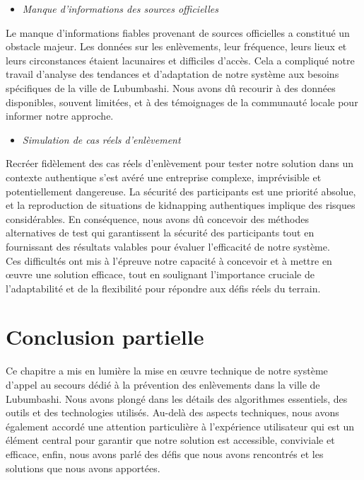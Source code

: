 \begin{itemize}
	\item \textit{Manque d'informations des sources officielles }
\end{itemize}

Le manque d'informations fiables provenant de sources officielles a constitué un obstacle majeur. Les données sur les enlèvements, leur fréquence, leurs lieux et leurs circonstances étaient lacunaires et difficiles d'accès. Cela a compliqué notre travail d'analyse des tendances et d'adaptation de notre système aux besoins spécifiques de la ville de Lubumbashi. Nous avons dû recourir à des données disponibles, souvent limitées, et à des témoignages de la communauté locale pour informer notre approche.

\begin{itemize}
	\item \textit{Simulation de cas réels d’enlèvement}
\end{itemize}

Recréer fidèlement des cas réels d'enlèvement pour tester notre solution dans un contexte authentique s'est avéré une entreprise complexe, imprévisible et potentiellement dangereuse. La sécurité des participants est une priorité absolue, et la reproduction de situations de kidnapping authentiques implique des risques considérables. En conséquence, nous avons dû concevoir des méthodes alternatives de test qui garantissent la sécurité des participants tout en fournissant des résultats valables pour évaluer l'efficacité de notre système.\\

Ces difficultés ont mis à l'épreuve notre capacité à concevoir et à mettre en œuvre une solution efficace, tout en soulignant l'importance cruciale de l'adaptabilité et de la flexibilité pour répondre aux défis réels du terrain.

\section{ Conclusion partielle}
Ce chapitre a mis en lumière la mise en œuvre technique de notre système d'appel au secours dédié à la prévention des enlèvements dans la ville de Lubumbashi. Nous avons plongé dans les détails des algorithmes essentiels, des outils et des technologies utilisés. Au-delà des aspects techniques, nous avons également accordé une attention particulière à l'expérience utilisateur qui est un élément central pour garantir que notre solution est accessible, conviviale et efficace, enfin, nous avons parlé des défis que nous avons rencontrés et les solutions que nous avons apportées.
